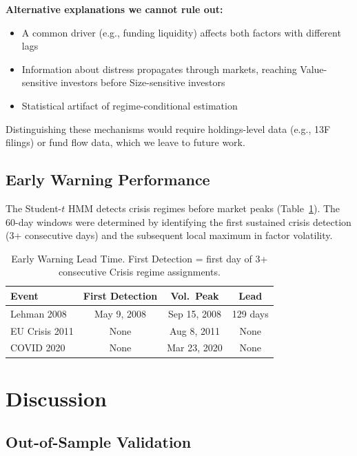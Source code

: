 \documentclass[sigconf]{acmart}
\begin{document}
\textbf{Alternative explanations we cannot rule out:}
\begin{itemize}
    \item A common driver (e.g., funding liquidity) affects both factors with different lags
    \item Information about distress propagates through markets, reaching Value-sensitive
    investors before Size-sensitive investors
    \item Statistical artifact of regime-conditional estimation
\end{itemize}

Distinguishing these mechanisms would require holdings-level data (e.g., 13F filings)
or fund flow data, which we leave to future work.

\subsection{Early Warning Performance}
\label{sec:early_warning}

The Student-$t$ HMM detects crisis regimes before market peaks (Table~\ref{tab:warning}).
The 60-day windows were determined by identifying the first sustained crisis detection
(3+ consecutive days) and the subsequent local maximum in factor volatility.

\begin{table}[t]
\centering
\caption{Early Warning Lead Time. First Detection = first day of 3+ consecutive
Crisis regime assignments.}
\label{tab:warning}
\small
\begin{tabular}{@{}lccc@{}}
\toprule
Event & First Detection & Vol.\ Peak & Lead \\
\midrule
Lehman 2008 & May 9, 2008 & Sep 15, 2008 & 129 days \\
EU Crisis 2011 & None & Aug 8, 2011 & None \\
COVID 2020 & None & Mar 23, 2020 & None \\
\bottomrule
\end{tabular}
\end{table}

\section{Discussion}

\subsection{Out-of-Sample Validation}
\label{sec:oos}
\end{document}
